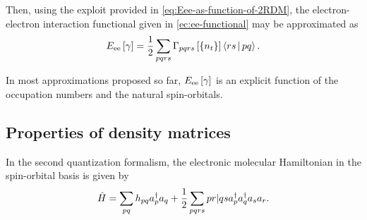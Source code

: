 Then, using the exploit provided in \cref{eq:Eee-as-function-of-2RDM}, the 
electron-electron interaction functional given in \cref{ec:ee-functional} may 
be approximated as
\begin{equation}
    E_{\text{ee}} \left[ \fordm \right]
    =
    \frac{1}{2} \sum_{pqrs}
    \sordm_{pqrs}\left[ \left\{ n_t \right\} \right] 
    \Braket{rs | pq}
    .
\end{equation}

In most approximations proposed so far, $E_{\text{ee}} \left[ \gamma \right]$
is an explicit function of the occupation numbers and the natural spin-orbitals. 

\subsection{Properties of density matrices} %
\label{sec:properties-of-density-matrices}

In the second quantization formalism, the electronic molecular Hamiltonian in 
the spin-orbital basis is given by
\begin{equation}
    \hat{H} =
    \sum_{pq} h_{pq} a_p^{\dagger} a_q
    +
    \frac{1}{2} \sum_{pqrs} \PBraket{pr | qs} a_p^{\dagger} a_q^{\dagger} a_s a_r
    .
\end{equation}

